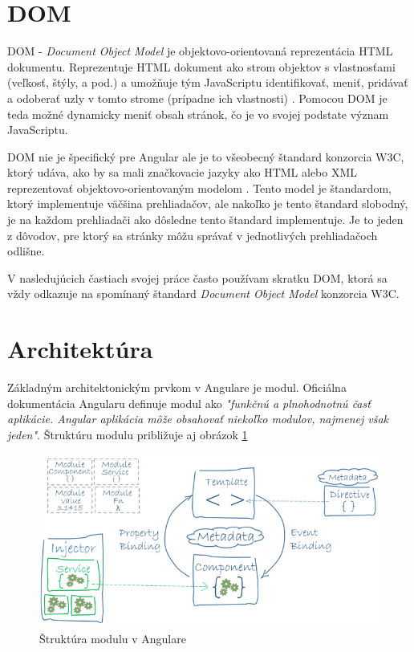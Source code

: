 \documentclass[
  digital, %
  twoside, %
  notable,   %
  nolof,   %
  nolot,   %
]{fithesis3}
\begin{document}
\section{DOM}
DOM - \textit{Document Object Model} je objektovo-orientovaná reprezentácia HTML dokumentu. Reprezentuje HTML dokument ako strom objektov s vlastnosťami (veľkosť, štýly, a pod.) a umožňuje tým JavaScriptu identifikovať, meniť, pridávať a odoberať uzly v tomto strome (prípadne ich vlastnosti) \cite{yang2009topic}. Pomocou DOM je teda možné dynamicky meniť obsah stránok, čo je vo svojej podstate význam JavaScriptu.

DOM nie je špecifický pre Angular ale je to všeobecný štandard konzorcia W3C, ktorý udáva, ako by sa mali značkovacie jazyky ako HTML alebo XML reprezentovať objektovo-orientovaným modelom \cite{wood1999programming}. Tento model je štandardom, ktorý implementuje väčšina prehliadačov, ale nakoľko je tento štandard slobodný, je na každom prehliadači ako dôsledne tento štandard implementuje. Je to jeden z dôvodov, pre ktorý sa stránky môžu správať v jednotlivých prehliadačoch odlišne.

V nasledujúcich častiach svojej práce často používam skratku DOM, ktorá sa vždy odkazuje na spomínaný štandard \textit{Document Object Model} konzorcia W3C.

\section{Architektúra}
Základným architektonickým prvkom v Angulare je modul. Oficiálna dokumentácia Angularu definuje modul ako \textit{"funkčnú a plnohodnotnú časť aplikácie. Angular aplikácia môže obsahovať niekoľko modulov, najmenej však jeden"}\cite{angular}. Štruktúru modulu približuje aj obrázok \ref{angular_architecture}

\begin{figure}[H]
	\center
	\includegraphics[width=1.0\linewidth]{angular_architecture}
	\caption{Štruktúra modulu v Angulare\cite{angular}}
	\label{angular_architecture}
\end{figure}
\end{document}
